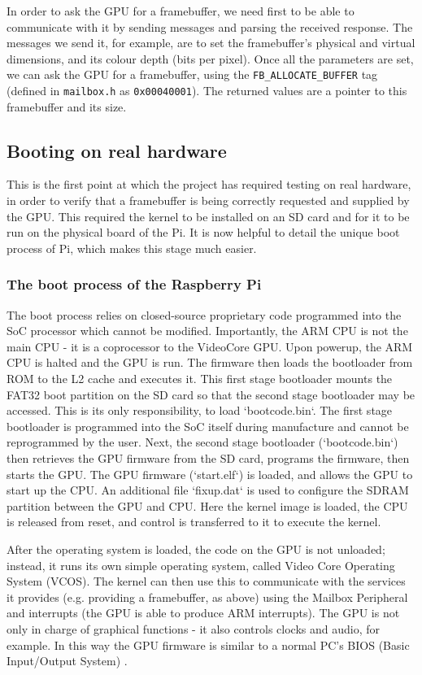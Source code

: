 \documentclass[10pt,a4paper]{article}
\newcommand{\code}[1]{\texttt{#1}}
\begin{document}
In order to ask the GPU for a framebuffer, we need first to be able to
communicate with it by sending messages and parsing the received response. The
messages we send it, for example, are to set the framebuffer's physical and
virtual dimensions, and its colour depth (bits per pixel). Once all the
parameters are set, we can ask the GPU for a framebuffer, using the
\code{FB\_ALLOCATE\_BUFFER} tag (defined in \code{mailbox.h} as
\code{0x00040001}). The returned values are a pointer to this framebuffer and its
size. 

\subsection{Booting on real hardware}
This is the first point at which the project has required testing on real
hardware, in order to verify that a framebuffer is being correctly requested and
supplied by the GPU. This required the kernel to be installed on an SD card and
for it to be run on the physical board of the Pi. It is now helpful to detail
the unique boot process of Pi, which makes this stage much easier.

\subsubsection{The boot process of the Raspberry Pi}
The boot process relies on closed-source proprietary code programmed into the
SoC processor \cite{Firmware} which cannot be modified. Importantly, the ARM CPU
is not the main CPU - it is a coprocessor to the VideoCore GPU. Upon powerup,
the ARM CPU is halted and the GPU is run. The firmware then loads the bootloader
from ROM to the L2 cache and executes it.  This first stage bootloader mounts
the FAT32 boot partition on the SD card so that the second stage bootloader may
be accessed.  This is its only responsibility, to load `bootcode.bin`. The first
stage bootloader is programmed into the SoC itself during manufacture and cannot
be reprogrammed by the user.  Next, the second stage bootloader (`bootcode.bin`)
then retrieves the GPU firmware from the SD card, programs the firmware, then
starts the GPU. The GPU firmware (`start.elf`) is loaded, and allows the GPU to
start up the CPU. An additional file `fixup.dat` is used to configure the SDRAM
partition between the GPU and CPU.  Here the kernel image is loaded, the CPU is
released from reset, and control is transferred to it to execute the kernel.

After the operating system is loaded, the code on the GPU is not unloaded;
instead, it runs its own simple operating system, called Video Core Operating
System (VCOS). The kernel can then use this to communicate with the services it
provides (e.g. providing a framebuffer, as above) using the Mailbox Peripheral
and interrupts (the GPU is able to produce ARM interrupts). The GPU is not only
in charge of graphical functions - it also controls clocks and audio, for
example. In this way the GPU firmware is similar to a normal PC's BIOS (Basic
Input/Output System) \cite{Boot1, Boot2}.
\end{document}
